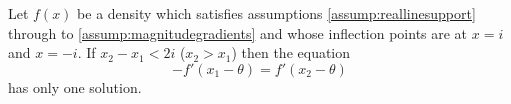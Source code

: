 
		\begin{lemma}
			\label{lem:magnitudegradients}
			Let $f(x)$ be a density which satisfies assumptions \ref{assump:reallinesupport} through to \ref{assump:magnitudegradients} and whose inflection points are at $x=i$ and $x=-i$. If 
			$x_2 - x_1 < 2i$ ($x_2 > x_1$) then the equation
			\begin{equation}
				-f'(x_1 - \theta) = f'(x_2 - \theta)
				\label{eq:gradientsequal}
			\end{equation}
			has only one solution.
		\end{lemma}
